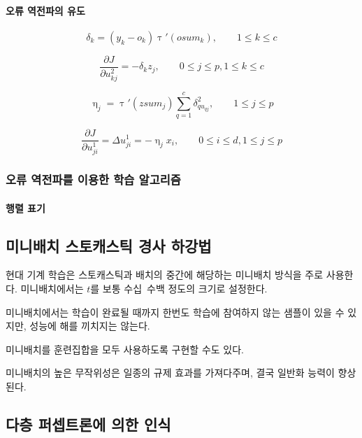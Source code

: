 \documentclass [12pt] {oblivoir}
\let\oldsubsubsection=\subsubsection
\renewcommand{\subsubsection}
{
  \filbreak
  \oldsubsubsection
}
\begin{document}
\paragraph*{오류 역전파의 유도}\mbox{}

\begin{equation} \tag{3.22}
  \delta_{k} = (y_{k} - o_{k})\uptau'(osum_{k}), \qquad 1 \le k \le c
\end{equation}

\begin{equation} \tag{3.23}
  \frac{\partial J}{\partial u_{kj}^{2}} = -\delta_{k}z_{j}, \qquad 0 \le j \le p, 1 \le k \le c
\end{equation}

\begin{equation} \tag{3.24}
  \upeta_{j} = \uptau'(zsum_{j})\sum_{q=1}^{c}\delta_{qu_{qj}}^{2}, \qquad 1 \le j \le p
\end{equation}

\begin{equation} \tag{3.25}
  \frac{\partial J}{\partial u_{ji}^{1}} = \Delta u_{ji}^{1} = -\upeta_{j}x_{i}, \qquad 0 \le i \le d, 1 \le j \le p
\end{equation}

\subsubsection{오류 역전파를 이용한 학습 알고리즘}

\paragraph*{행렬 표기}\mbox{}

\subsection{미니배치 스토캐스틱 경사 하강법}

현대 기계 학습은 스토캐스틱과 배치의 중간에 해당하는 미니배치 방식을 주로 사용한다.
미니배치에서는 $t$를 보통 수십~수백 정도의 크기로 설정한다.

미니배치에서는 학습이 완료될 때까지 한번도 학습에 참여하지 않는 샘플이 있을 수 있지만, 성능에 해를 끼치지는 않는다.

미니배치를 훈련집합을 모두 사용하도록 구현할 수도 있다.

미니배치의 높은 무작위성은 일종의 규제 효과를 가져다주며, 결국 일반화 능력이 향상된다.

\subsection{다층 퍼셉트론에 의한 인식}
\end{document}
